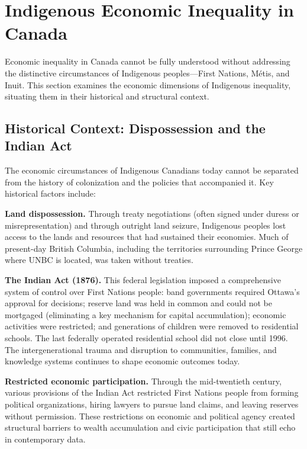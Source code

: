 \section{Indigenous Economic Inequality in Canada}

Economic inequality in Canada cannot be fully understood without addressing the distinctive circumstances of Indigenous peoples---First Nations, Métis, and Inuit. This section examines the economic dimensions of Indigenous inequality, situating them in their historical and structural context.

\subsection{Historical Context: Dispossession and the Indian Act}

The economic circumstances of Indigenous Canadians today cannot be separated from the history of colonization and the policies that accompanied it. Key historical factors include:

\textbf{Land dispossession.} Through treaty negotiations (often signed under duress or misrepresentation) and through outright land seizure, Indigenous peoples lost access to the lands and resources that had sustained their economies. Much of present-day British Columbia, including the territories surrounding Prince George where UNBC is located, was taken without treaties.

\textbf{The Indian Act (1876).} This federal legislation imposed a comprehensive system of control over First Nations people: band governments required Ottawa's approval for decisions; reserve land was held in common and could not be mortgaged (eliminating a key mechanism for capital accumulation); economic activities were restricted; and generations of children were removed to residential schools. The last federally operated residential school did not close until 1996. The intergenerational trauma and disruption to communities, families, and knowledge systems continues to shape economic outcomes today.

\textbf{Restricted economic participation.} Through the mid-twentieth century, various provisions of the Indian Act restricted First Nations people from forming political organizations, hiring lawyers to pursue land claims, and leaving reserves without permission. These restrictions on economic and political agency created structural barriers to wealth accumulation and civic participation that still echo in contemporary data.

